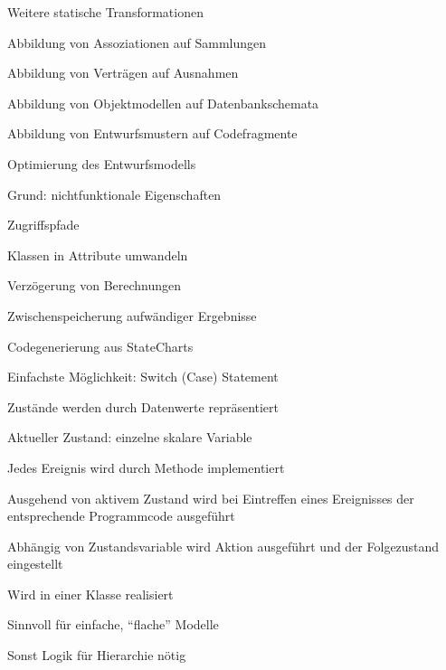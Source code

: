 \documentclass[a4paper]{article}
\begin{document}
\begin{multicols}{3}

  Weitere statische Transformationen
  \begin{itemize*}
    \item Abbildung von Assoziationen auf Sammlungen
    \item Abbildung von Verträgen auf Ausnahmen
    \item Abbildung von Objektmodellen auf Datenbankschemata
    \item Abbildung von Entwurfsmustern auf Codefragmente
  \end{itemize*}

  Optimierung des Entwurfsmodells
  \begin{itemize*}
    \item Grund: nichtfunktionale Eigenschaften
    \item Zugriffspfade
    \item Klassen in Attribute umwandeln
    \item Verzögerung von Berechnungen
    \item Zwischenspeicherung aufwändiger Ergebnisse
  \end{itemize*}

  Codegenerierung aus StateCharts
  \begin{itemize*}
    \item Einfachste Möglichkeit: Switch (Case) Statement
    \item Zustände werden durch Datenwerte repräsentiert
          \begin{itemize*}
            \item Aktueller Zustand: einzelne skalare Variable
          \end{itemize*}
    \item Jedes Ereignis wird durch Methode implementiert
    \item Ausgehend von aktivem Zustand wird bei Eintreffen eines Ereignisses der entsprechende Programmcode ausgeführt
    \item Abhängig von Zustandsvariable wird Aktion ausgeführt und der Folgezustand eingestellt
    \item Wird in einer Klasse realisiert
    \item Sinnvoll für einfache, “flache” Modelle
          \begin{itemize*}
            \item Sonst Logik für Hierarchie nötig
          \end{itemize*}
  \end{itemize*}


\end{multicols}
\end{document}
